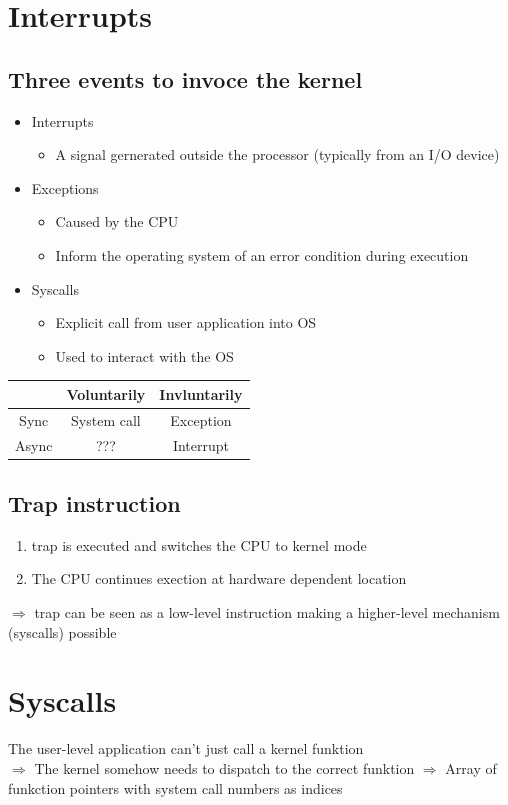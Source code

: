 \documentclass{kit}
\begin{document}
\section{Interrupts}
  \subsection{Three events to invoce the kernel}
    \begin{itemize}
      \item Interrupts
        \begin{itemize}
          \item A signal gernerated outside the processor (typically from an I/O device)
        \end{itemize}
      \item Exceptions
        \begin{itemize}
          \item Caused by the CPU
          \item Inform the operating system of an error condition during execution
        \end{itemize}
      \item Syscalls
        \begin{itemize}
          \item Explicit call from user application into OS
          \item Used to interact with the OS
        \end{itemize}
    \end{itemize}
    \begin{tabular}{c|cc}
       & Voluntarily & Invluntarily \\ \hline
      Sync & System call & Exception \\
      Async & ??? & Interrupt
    \end{tabular}
  \subsection{Trap instruction}
  \begin{enumerate}[label=\arabic*.]
      \item trap is executed and switches the CPU to kernel mode
      \item The CPU continues exection at hardware dependent location
    \end{enumerate}
    $\Rightarrow$ trap can be seen as a low-level instruction making a higher-level mechanism (syscalls) possible
\section{Syscalls}
  The user-level application can't just call a kernel funktion\\
  $\Rightarrow$ The kernel somehow needs to dispatch to the correct funktion
  $\Rightarrow$ Array of funkction pointers with system call numbers as indices
\end{document}
